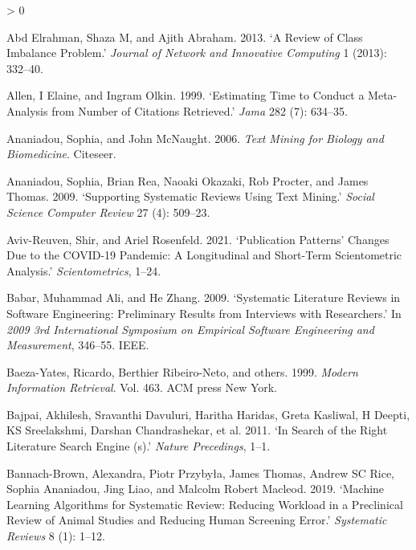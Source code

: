 \documentclass{article}
\newlength{\cslhangindent}
\newenvironment{CSLReferences}[2] %
 {%
  \setlength{\parindent}{0pt}
  \ifodd #1 \everypar{\setlength{\hangindent}{\cslhangindent}}\ignorespaces\fi
  \ifnum #2 > 0
  \setlength{\parskip}{#2\baselineskip}
  \fi
 }%
 {}
\begin{document}
\hypertarget{refs}{}
\begin{CSLReferences}{1}{0}
\leavevmode\hypertarget{ref-abd2013review}{}%
Abd Elrahman, Shaza M, and Ajith Abraham. 2013. {`A Review of Class
Imbalance Problem.'} \emph{Journal of Network and Innovative Computing}
1 (2013): 332--40.

\leavevmode\hypertarget{ref-allen1999estimating}{}%
Allen, I Elaine, and Ingram Olkin. 1999. {`Estimating Time to Conduct a
Meta-Analysis from Number of Citations Retrieved.'} \emph{Jama} 282 (7):
634--35.

\leavevmode\hypertarget{ref-ananiadou2006text}{}%
Ananiadou, Sophia, and John McNaught. 2006. \emph{Text Mining for
Biology and Biomedicine}. Citeseer.

\leavevmode\hypertarget{ref-ananiadou2009supporting}{}%
Ananiadou, Sophia, Brian Rea, Naoaki Okazaki, Rob Procter, and James
Thomas. 2009. {`Supporting Systematic Reviews Using Text Mining.'}
\emph{Social Science Computer Review} 27 (4): 509--23.

\leavevmode\hypertarget{ref-aviv2021publication}{}%
Aviv-Reuven, Shir, and Ariel Rosenfeld. 2021. {`Publication Patterns'
Changes Due to the COVID-19 Pandemic: A Longitudinal and Short-Term
Scientometric Analysis.'} \emph{Scientometrics}, 1--24.

\leavevmode\hypertarget{ref-babar2009systematic}{}%
Babar, Muhammad Ali, and He Zhang. 2009. {`Systematic Literature Reviews
in Software Engineering: Preliminary Results from Interviews with
Researchers.'} In \emph{2009 3rd International Symposium on Empirical
Software Engineering and Measurement}, 346--55. IEEE.

\leavevmode\hypertarget{ref-baeza1999modern}{}%
Baeza-Yates, Ricardo, Berthier Ribeiro-Neto, and others. 1999.
\emph{Modern Information Retrieval}. Vol. 463. ACM press New York.

\leavevmode\hypertarget{ref-bajpai2011search}{}%
Bajpai, Akhilesh, Sravanthi Davuluri, Haritha Haridas, Greta Kasliwal, H
Deepti, KS Sreelakshmi, Darshan Chandrashekar, et al. 2011. {`In Search
of the Right Literature Search Engine (s).'} \emph{Nature Precedings},
1--1.

\leavevmode\hypertarget{ref-bannach2019machine}{}%
Bannach-Brown, Alexandra, Piotr Przybyła, James Thomas, Andrew SC Rice,
Sophia Ananiadou, Jing Liao, and Malcolm Robert Macleod. 2019. {`Machine
Learning Algorithms for Systematic Review: Reducing Workload in a
Preclinical Review of Animal Studies and Reducing Human Screening
Error.'} \emph{Systematic Reviews} 8 (1): 1--12.


\end{CSLReferences}
\end{document}
